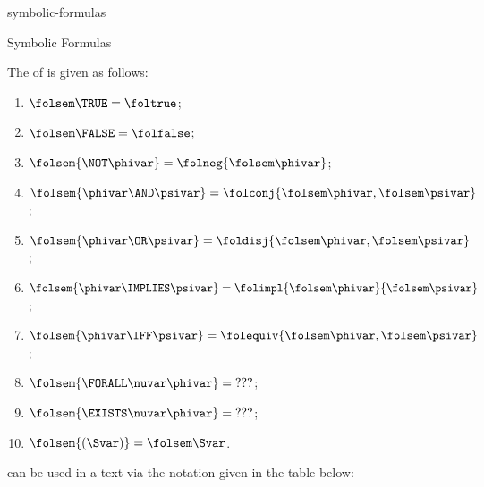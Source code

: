 \documentclass{stex}
\begin{document}
\begin{smodule}{symbolic-formulas}
\begin{sfragment}[id=sec:symbolic-formulas]{Symbolic Formulas}
\begin{sparagraph}[style=symdoc]
    \noindent
    The  of  is given as follows:
    \begin{enumerate}
      \item $\folsem\TRUE=\foltrue$;
      \item $\folsem\FALSE=\folfalse$;
      \item $\folsem{\NOT\phivar}=\folneg{\folsem\phivar}$;
      \item $\folsem{\phivar\AND\psivar}=\folconj{\folsem\phivar,\folsem\psivar}$;
      \item $\folsem{\phivar\OR\psivar}=\foldisj{\folsem\phivar,\folsem\psivar}$;
      \item $\folsem{\phivar\IMPLIES\psivar}=\folimpl{\folsem\phivar}{\folsem\psivar}$;
      \item $\folsem{\phivar\IFF\psivar}=\folequiv{\folsem\phivar,\folsem\psivar}$;
      \item $\folsem{\FORALL\nuvar\phivar}={???}$;
      \item $\folsem{\EXISTS\nuvar\phivar}={???}$;
      \item $\folsem{(\Svar)}=\folsem\Svar$.
    \end{enumerate}

     can be used in a \ForTheL text via the notation given in the
    table below:


\end{sparagraph}
\end{sfragment}
\end{smodule}
\end{document}
